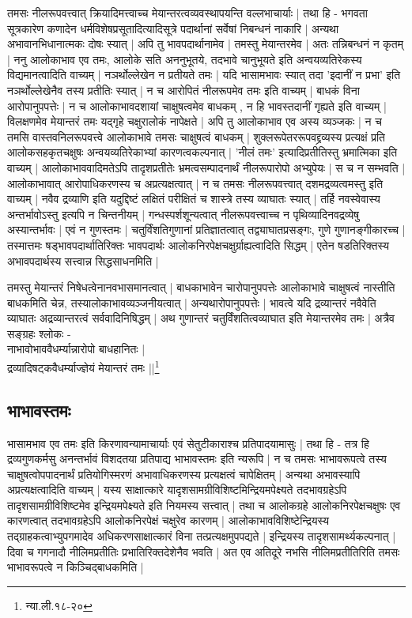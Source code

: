 तमसः नीलरूपवत्त्वात् क्रियादिमत्त्वाच्च मेयान्तरत्वव्यवस्थापयन्ति वल्लभाचार्याः | तथा हि - भगवता सूत्रकारेण कणादेन धर्मविशेषप्रसूतादित्यादिसूत्रे पदार्थानां सर्वेषां निबन्धनं नाकारि | अन्यथा अभावानभिधानात्मकः दोषः स्यात् | अपि तु भावपदार्थानामेव | तमस्तु मेयान्तरमेव | अतः तन्निबन्धनं न कृतम् | ननु आलोकाभाव एव तमः, आलोके सति अननुभूतये, तदभावे चानुभूयते इति अन्वयव्यतिरेकस्य विद्यमानत्वादिति वाच्यम् | नञर्थोल्लेखेन न प्रतीयते तमः | यदि भासामभावः‌ स्यात् तदा 'इदानीं न प्रभा' इति नञर्थोल्लेखेनैव तस्य प्रतीतिः स्यात् | न च आरोपितं नीलरूपमेव तमः इति वाच्यम् | बाधकं विना आरोपानुपपत्तेः | न च आलोकाभावदशायां चाक्षुषत्वमेव बाधकम् , न हि भावस्तदानीं गृह्यते  इति वाच्यम् | विलक्षणमेव मेयान्तरं तमः यद्गृहे चक्षुरालोकं नापेक्षते | अपि तु आलोकाभाव एव अस्य व्यञ्जकः | न च तमसि वास्तवनिलरूपवत्त्वे आलोकाभावे तमसः चाक्षुषत्वं बाधकम् | शुक्लरूपेतररूपवद्द्रव्यस्य प्रत्यक्षं प्रति आलोकसहकृतचक्षुषः अन्वयव्यतिरेकाभ्यां कारणत्वकल्पनात् | 'नीलं तमः' इत्यादिप्रतीतिस्तु भ्रमात्मिका इति वाच्यम् | आलोकाभाववादिमतेऽपि तादृशप्रतीतेः भ्रमत्वसम्पादनार्थं नीलरूपारोपो अभ्युपेयः | स च न सम्भवति | आलोकाभावात् आरोपाधिकरणस्य च अप्रत्यक्षत्वात् | न च तमसः नीलरूपवत्त्वात् दशमद्रव्यत्वमस्तु इति वाच्यम् | नवैव द्रव्याणि इति यदुद्दिष्टं लक्षितं परीक्षितं च शास्त्रे तस्य व्याघातः स्यात् | तर्हि नवस्वेवास्य अन्तर्भावोऽस्तु इत्यपि न चिन्तनीयम् | गन्धस्पर्शशून्यत्वात् नीलरूपवत्त्वाच्च न पृथिव्यादिनवद्रव्येषु अस्यान्तर्भावः | एवं न गुणस्तमः | चतुर्विंशतिगुणानां प्रतिज्ञातत्वात् तद्व्याघातप्रसङ्गः, गुणे गुणानङ्गीकारच्च | तस्मात्तमः षड्भावपदार्थातिरिक्तः भावपदार्थः आलोकनिरपेक्षचक्षुर्ग्राह्यत्वादिति सिद्धम् | एतेन षडतिरिक्तस्य अभावपदार्थस्य सत्त्वान्न सिद्धसाधनमिति |

{\fontsize{11.7}{0}\selectfont\s तमस्तु मेयान्तरं निषेधत्वेनानवभासमानत्वात् | बाधकाभावेन चारोपानुपपत्तेः आलोकाभावे चाक्षुषत्वं नास्तीति बाधकमिति चेन्न, तस्यालोकाभावव्यञ्जनीयत्वात् | अन्यथारोपानुपपत्तेः | भावत्वे यदि द्रव्यान्तरं नवैवेति व्याघातः अद्रव्यान्तरत्वं सर्ववादिनिषिद्धम् | अथ गुणान्तरं चतुर्विंशतित्वव्याघात इति मेयान्तरमेव तमः | अत्रैव सङ्ग्रहः श्लोकः -\\ नाभावोभाववैधर्म्यान्नारोपो बाधहानितः |\\[-5mm] द्रव्यादिषट्कवैधर्म्याज्ज्ञेयं मेयान्तरं तमः ||\footnote{न्या.ली.१८-२०}}


\subsection{भाभावस्तमः}

भासामभाव एव तमः इति किरणावन्यामाचार्याः एवं सेतुटीकाराश्च प्रतिपादयामासुः | तथा हि - तत्र हि द्रव्यगुणकर्मसु अनन्तर्भावं विशदतया प्रतिपाद्य भाभावस्तमः इति न्यरूपि | न च तमसः भाभावरूपत्वे तस्य चाक्षुषत्वोपपादनार्थं प्रतियोगिस्मरणं अभावाधिकरणस्य प्रत्यक्षत्वं चापेक्षितम् | अन्यथा अभावस्यापि अप्रत्यक्षत्वादिति वाच्यम् |‌ यस्य साक्षात्कारे यादृशसामग्रीविशिष्टमिन्द्रियमपेक्ष्यते तदभावग्रहेऽपि तादृशसामग्रीविशिष्टमेव इन्द्रियमपेक्ष्यते इति नियमस्य सत्त्वात् | तथा च आलोकग्रहे आलोकनिरपेक्षचक्षुषः एव कारणत्वात् तदभावग्रहेऽपि आलोकनिरपेक्षं चक्षुरेव कारणम् | आलोकाभावविशिष्टेन्द्रियस्य तद्ग्राहकत्वाभ्युपगमादेव अधिकरणसाक्षात्कारं विना तत्प्रत्यक्षमुपपद्यते | इन्द्रियस्य तादृशसामर्थ्यकल्पनात् | दिवा च गगनादौ नीलिमप्रतीतिः प्रभातिरिक्तदेशेनैव भवति | अत एव अतिदूरे नभसि नीलिमप्रतीतिरिति तमसः भाभावरूपत्वे न किञ्चिद्बाधकमिति |

